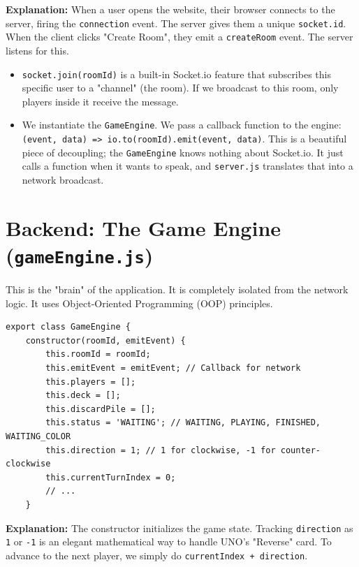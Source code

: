 \documentclass[11pt,a4paper]{article}
\begin{document}
\textbf{Explanation:} 
When a user opens the website, their browser connects to the server, firing the \texttt{connection} event. The server gives them a unique \texttt{socket.id}.
When the client clicks "Create Room", they emit a \texttt{createRoom} event. The server listens for this.
\begin{itemize}
    \item \texttt{socket.join(roomId)} is a built-in Socket.io feature that subscribes this specific user to a "channel" (the room). If we broadcast to this room, only players inside it receive the message.
    \item We instantiate the \texttt{GameEngine}. We pass a callback function to the engine: \texttt{(event, data) => io.to(roomId).emit(event, data)}. This is a beautiful piece of decoupling; the \texttt{GameEngine} knows nothing about Socket.io. It just calls a function when it wants to speak, and \texttt{server.js} translates that into a network broadcast.
\end{itemize}

\section{Backend: The Game Engine (\texttt{gameEngine.js})}
This is the "brain" of the application. It is completely isolated from the network logic. It uses Object-Oriented Programming (OOP) principles.

\begin{verbatim}
export class GameEngine {
    constructor(roomId, emitEvent) {
        this.roomId = roomId;
        this.emitEvent = emitEvent; // Callback for network
        this.players = [];
        this.deck = [];
        this.discardPile = [];
        this.status = 'WAITING'; // WAITING, PLAYING, FINISHED, WAITING_COLOR
        this.direction = 1; // 1 for clockwise, -1 for counter-clockwise
        this.currentTurnIndex = 0;
        // ...
    }
\end{verbatim}

\textbf{Explanation:} 
The constructor initializes the game state. Tracking \texttt{direction} as \texttt{1} or \texttt{-1} is an elegant mathematical way to handle UNO's "Reverse" card. To advance to the next player, we simply do \texttt{currentIndex + direction}. 
\end{document}
